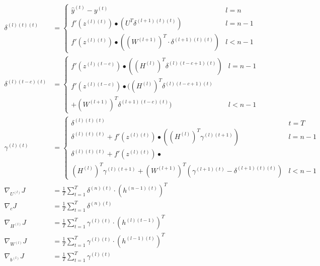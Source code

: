 \documentclass{article}
\begin{document}
	\begin{framed}
	\begin{align}
		\delta^{(l)(t)(t)} &=
		\begin{cases}
			\hat{y}^{(t)} - y^{(t)} &l=n\\	
			f'(z^{(l)(t)}) \bullet (U^T \delta^{(l+1)(t)(t)}) &l=n-1\\
			f'(z^{(l)(t)}) \bullet ((W^{(l+1)})^T \cdot \delta^{(l+1)(t)(t)}) &l<n-1
		\end{cases} 
		\\
		\delta^{(l)(t-c)(t)} &=
		\begin{cases}
			f'(z^{(l)(t-c)}) \bullet ((H^{(l)})^T \delta^{(l)(t-c+1)(t)}) &l=n-1\\
			f'(z^{(l)(t-c)}) \bullet ((H^{(l)})^T \delta^{(l)(t-c+1)(t)} \\+ (W^{(l+1)})^T \delta^{(l+1)(t-c)(t)}) &l<n-1
		\end{cases} 
		\\
		\gamma^{(l)(t)} &= 
		\begin{cases}
		\delta^{(l)(t)(t)} &t=T
		\\
		\delta^{(l)(t)(t)} + f'(z^{(l)(t)}) \bullet ((H^{(l)})^T \gamma^{(l)(t+1)}) &l=n-1
		\\
		\delta^{(l)(t)(t)} + f'(z^{(l)(t)}) \bullet \\ (H^{(l)})^T \gamma^{(l)(t+1)} + (W^{(l+1)})^T (\gamma^{(l+1)(t)} - \delta^{(l+1)(t)(t)}) &l<n-1
		\end{cases}
		\\
		\nabla_{U^{(l)}} J &= \frac{1}{T} \sum_{t=1}^{T}\delta^{(n)(t)} \cdot (h^{(n-1)(t)})^T\\
		\nabla_{c} J &= \frac{1}{T} \sum_{t=1}^{T}\delta^{(n)(t)} 
		\\
		\nabla_{H^{(l)}} J &= \frac{1}{T} \sum_{t=1}^{T} \gamma^{(l)(t)} \cdot  (h^{(l)(t-1)})^T
		\\
		\nabla_{W^{(l)}} J &= \frac{1}{T} \sum_{t=1}^{T} \gamma^{(l)(t)} \cdot  (h^{(l-1)(t)})^T
		\\
		\nabla_{b^{(l)}} J &= \frac{1}{T} \sum_{t=1}^{T} \gamma^{(l)(t)}
	\end{align}
	\end{framed}
\end{document}
